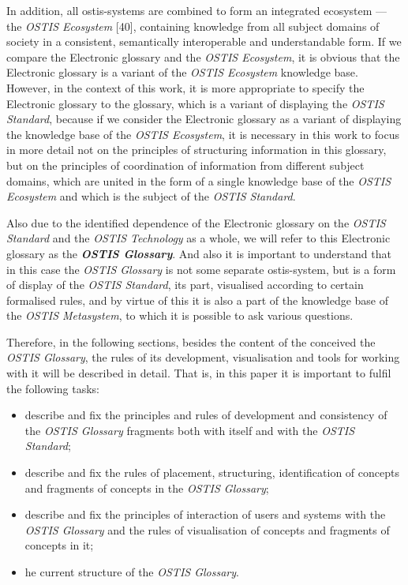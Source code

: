 \documentclass[10 pt]{extarticle}
\begin{document}
\begin{multicols}{2}
In addition, all ostis-systems are combined to form
an integrated ecosystem — the \textit{OSTIS Ecosystem} [40],
containing knowledge from all subject domains of society
in a consistent, semantically interoperable and understandable form. If we compare the Electronic glossary
and the \textit{OSTIS Ecosystem}, it is obvious that the Electronic
glossary is a variant of the \textit{OSTIS Ecosystem} knowledge
base. However, in the context of this work, it is more
appropriate to specify the Electronic glossary to the
glossary, which is a variant of displaying the \textit{OSTIS Standard}, because if we consider the Electronic glossary as
a variant of displaying the knowledge base of the \textit{OSTIS
Ecosystem}, it is necessary in this work to focus in more
detail not on the principles of structuring information in
this glossary, but on the principles of coordination of
information from different subject domains, which are
united in the form of a single knowledge base of the
\textit{OSTIS Ecosystem} and which is the subject of the \textit{OSTIS
Standard}.

Also due to the identified dependence of the Electronic glossary on the \textit{OSTIS Standard} and the \textit{OSTIS Technology} as a whole, we will refer to this Electronic
glossary as the \textbf{\textit{OSTIS Glossary}}. And also it is important
to understand that in this case the \textit{OSTIS Glossary} is not
some separate ostis-system, but is a form of display of the
\textit{OSTIS Standard}, its part, visualised according to certain
formalised rules, and by virtue of this it is also a part of
the knowledge base of the \textit{OSTIS Metasystem}, to which
it is possible to ask various questions.

Therefore, in the following sections, besides the content of the conceived the \textit{OSTIS Glossary}, the rules of
its development, visualisation and tools for working with
it will be described in detail. That is, in this paper it is
important to fulfil the following tasks:

\setlength{\parskip}{3 pt}

\begin{itemize}
    \item describe and fix the principles and rules of development and consistency of the \textit{OSTIS Glossary}
fragments both with itself and with the \textit{OSTIS Standard};
    \item \setlength{\parskip}{0 pt} describe and fix the rules of placement, structuring,
identification of concepts and fragments of concepts
in the \textit{OSTIS Glossary};
    \item  describe and fix the principles of interaction of
users and systems with the \textit{OSTIS Glossary} and the
rules of visualisation of concepts and fragments of
concepts in it;
    \item he current structure of the \textit{OSTIS Glossary}.
\end{itemize}


\end{multicols}
\end{document}
